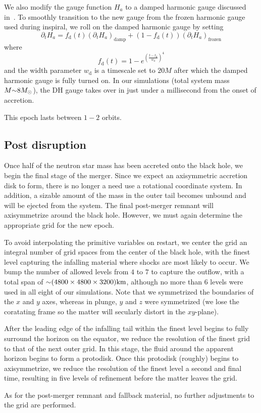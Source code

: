 We also modify the gauge function $H_a$ to a damped harmonic gauge discussed in~\cite{Szilagyi:2014fna}.  To smoothly transition to the new gauge from the frozen harmonic gauge used during inspiral, we roll on the damped harmonic gauge by setting
\begin{equation}
\partial_t H_a = f_\textrm{d}(t) (\partial_t H_a)_\textrm{damp} + (1 - f_\textrm{d}(t)) (\partial_t H_a)_\textrm{frozen}
\end{equation}
where 
\begin{equation}
f_\textrm{d}(t) = 1 - e^{ \left(\frac{t-t_\textrm{d}}{w_\textrm{d}} \right)^4 }
\end{equation}
and the width parameter $w_\textrm{d}$ is a timescale set to $20 M$ after which the damped harmonic gauge is fully turned on.  In our simulations (total system mass $M \mathord{\sim} 8 M_\odot$), the DH gauge takes over in just under a millisecond from the onset of accretion.

This epoch lasts between $1 - 2$ orbits.

\subsection{Post disruption}

Once half of the neutron star mass has been accreted onto the black hole, we begin the final stage of the merger.  
Since we expect an axisymmetric accretion disk to form, there is no longer a need use a rotational coordinate system.
In addition, a sizable amount of the mass in the outer tail becomes unbound and will be ejected from the system.  
The final post-merger remnant will axisymmetrize around the black hole.
However, we must again determine the appropriate grid for the new epoch.

To avoid interpolating the primitive variables on restart, we center the grid an integral number of grid spaces from the center of the black hole, with the finest level capturing the infalling material where shocks are most likely to occur.  
We bump the number of allowed levels from $4$ to $7$ to capture the outflow, with a total span of $\mathord{\sim}(4800 \times 4800 \times 3200) \textrm{km}$, although no more than $6$ levels were used in all eight of our simulations.
Note that we symmetrized the boundaries of the $x$ and $y$ axes, whereas in plunge, $y$ and $z$ were symmetrized (we lose the coratating frame so the matter will secularly distort in the $xy$-plane).    

After the leading edge of the infalling tail within the finest level begins to fully surround the horizon on the equator, we reduce the resolution of the finest grid to that of the next outer grid. 
In this stage, the fluid around the apparent horizon begins to form a protodisk.
Once this protodisk (roughly) begins to axisymmetrize, we reduce the resolution of the finest level a second and final time, resulting in five levels of refinement before the matter leaves the grid.

As for the post-merger remnant and fallback material, no further adjustments to the grid are performed.









